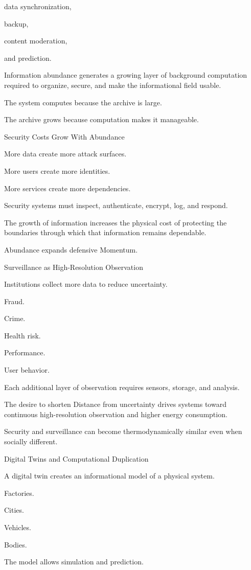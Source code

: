 data synchronization,

backup,

content moderation,

and prediction.

Information abundance generates a growing layer of background computation required to organize, secure, and make the informational field usable.

The system computes because the archive is large.

The archive grows because computation makes it manageable.

Security Costs Grow With Abundance

More data create more attack surfaces.

More users create more identities.

More services create more dependencies.

Security systems must inspect, authenticate, encrypt, log, and respond.

The growth of information increases the physical cost of protecting the boundaries through which that information remains dependable.

Abundance expands defensive Momentum.

Surveillance as High-Resolution Observation

Institutions collect more data to reduce uncertainty.

Fraud.

Crime.

Health risk.

Performance.

User behavior.

Each additional layer of observation requires sensors, storage, and analysis.

The desire to shorten Distance from uncertainty drives systems toward continuous high-resolution observation and higher energy consumption.

Security and surveillance can become thermodynamically similar even when socially different.

Digital Twins and Computational Duplication

A digital twin creates an informational model of a physical system.

Factories.

Cities.

Vehicles.

Bodies.

The model allows simulation and prediction.

